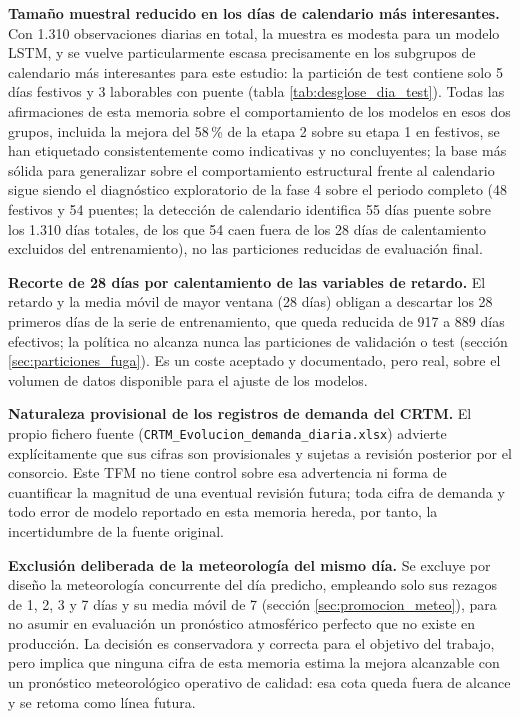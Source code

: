 \textbf{Tamaño muestral reducido en los días de calendario más interesantes.} Con 1.310
observaciones diarias en total, la muestra es modesta para un modelo LSTM, y se vuelve
particularmente escasa precisamente en los subgrupos de calendario más interesantes para
este estudio: la partición de test contiene solo 5 días festivos y 3 laborables con puente
(tabla \ref{tab:desglose_dia_test}). Todas las afirmaciones de esta memoria sobre el
comportamiento de los modelos en esos dos grupos, incluida la mejora del 58\,\% de la
etapa 2 sobre su etapa 1 en festivos, se han etiquetado consistentemente como indicativas
y no concluyentes; la base más sólida para generalizar sobre el comportamiento estructural
frente al calendario sigue siendo el diagnóstico exploratorio de la fase 4 sobre el
periodo completo (48 festivos y 54 puentes; la detección de calendario identifica 55 días
puente sobre los 1.310 días totales, de los que 54 caen fuera de los 28 días de
calentamiento excluidos del entrenamiento), no las particiones reducidas de evaluación
final.

\textbf{Recorte de 28 días por calentamiento de las variables de retardo.} El retardo y
la media móvil de mayor ventana (28 días) obligan a descartar los 28 primeros días de la
serie de entrenamiento, que queda reducida de 917 a 889 días efectivos; la política no
alcanza nunca las particiones de validación o test (sección \ref{sec:particiones_fuga}).
Es un coste aceptado y documentado, pero real, sobre el volumen de datos disponible para
el ajuste de los modelos.

\textbf{Naturaleza provisional de los registros de demanda del CRTM.} El propio fichero
fuente (\texttt{CRTM\_Evolucion\_demanda\_diaria.xlsx}) advierte explícitamente que sus
cifras son provisionales y sujetas a revisión posterior por el consorcio. Este TFM no
tiene control sobre esa advertencia ni forma de cuantificar la magnitud de una eventual
revisión futura; toda cifra de demanda y todo error de modelo reportado en esta memoria
hereda, por tanto, la incertidumbre de la fuente original.

\textbf{Exclusión deliberada de la meteorología del mismo día.} Se excluye por diseño la
meteorología concurrente del día predicho, empleando solo sus rezagos de 1, 2, 3 y 7 días
y su media móvil de 7 (sección \ref{sec:promocion_meteo}), para no asumir en evaluación un
pronóstico atmosférico perfecto que no existe en producción. La decisión es conservadora
y correcta para el objetivo del trabajo, pero implica que ninguna cifra de esta memoria
estima la mejora alcanzable con un pronóstico meteorológico operativo de calidad: esa
cota queda fuera de alcance y se retoma como línea futura.


